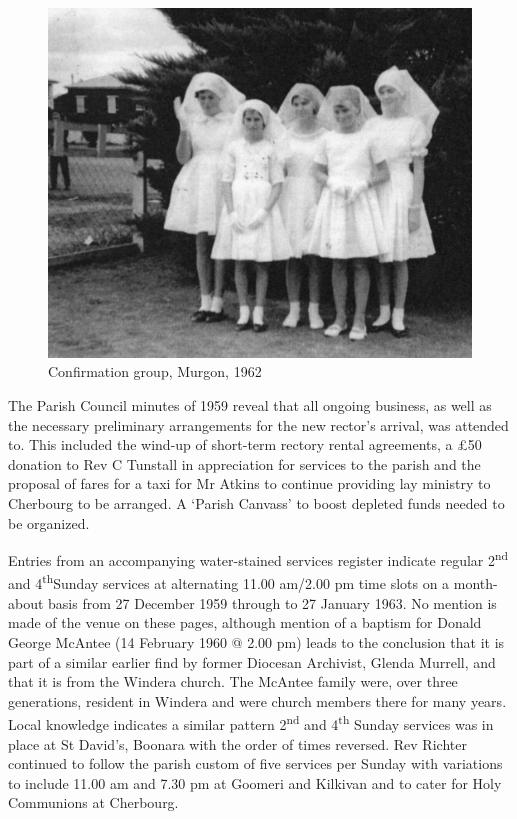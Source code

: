 \begin{figure}
\begin{center}
\includegraphics[width=1.\linewidth,center]{../images/confirmation1962.jpg}
\caption{Confirmation group, Murgon, 1962}
\end{center}
\end{figure}




The Parish Council minutes of 1959 reveal that all ongoing business, as well as the necessary preliminary arrangements for the new rector's arrival, was attended to. This included the wind-up of short-term rectory rental agreements, a \pounds50 donation to Rev C Tunstall in appreciation for services to the parish and the proposal of  fares for a taxi for Mr Atkins to continue providing lay ministry to Cherbourg to be arranged. A `Parish Canvass' to boost depleted funds needed to be organized.



Entries from an accompanying water-stained services register indicate regular 2\textsuperscript{nd} and 4\textsuperscript{th}Sunday services at alternating 11.00 am/2.00 pm time slots on a month-about basis from 27 December 1959 through to 27 January 1963. No mention is made of the venue on these pages, although mention of a baptism for Donald George McAntee (14 February 1960 @ 2.00 pm) leads to the conclusion that it is part of a similar earlier find by former Diocesan Archivist, Glenda Murrell, and that it is from the Windera church. The McAntee family were, over three generations, resident in Windera and were church members there for many years. Local knowledge indicates a similar pattern 2\textsuperscript{nd} and 4\textsuperscript{th} Sunday services was in place at St David's, Boonara with the order of times reversed. Rev Richter continued to follow the parish custom of five services per Sunday with variations to include 11.00 am and 7.30 pm at Goomeri and Kilkivan and to cater for Holy Communions at Cherbourg.









